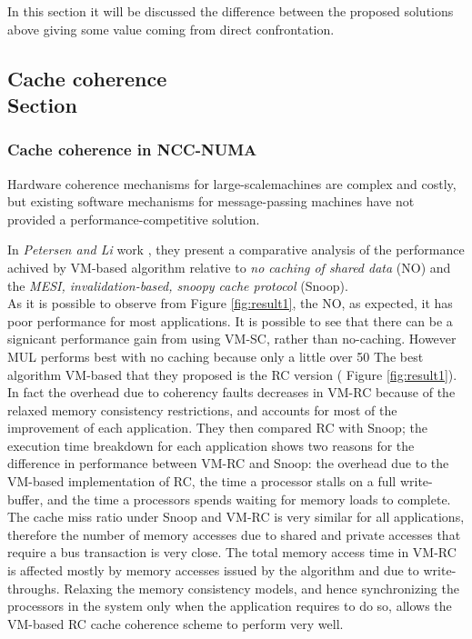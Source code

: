 \documentclass[a4paper,10pt]{article}
\begin{document}
\begin{multicols}{2}
In this section it will be discussed the difference between the proposed solutions above giving some value coming from direct confrontation.

\subsection{Cache coherence \\ Section}

\subsubsection{Cache coherence in NCC-NUMA}
Hardware coherence mechanisms for large-scalemachines are complex and costly, but existing software mechanisms for message-passing machines have not provided a performance-competitive solution. \par 
\parindent 10mm In  \emph{Petersen and Li} work \cite{Li95multiprocessorcache},  they present a comparative analysis of the performance achived by VM-based algorithm relative to \emph{no caching of shared data} (NO) and the \emph{MESI, invalidation-based, snoopy cache protocol} (Snoop). \\
As it is possible to observe from Figure \ref{fig:result1}, the NO, as expected, it has poor performance for most applications. It is possible to see that there can be a signicant performance gain from using VM-SC, rather than no-caching. However MUL performs best with no caching because only a little over 50%
\parindent 10mm The best algorithm VM-based that they proposed is the RC version ( Figure \ref{fig:result1}). In fact the overhead due to coherency faults decreases in VM-RC because of the relaxed memory consistency restrictions, and accounts for most of the improvement of each application. They then compared RC with Snoop; the execution time breakdown for each application shows two reasons for the difference in performance between VM-RC and Snoop: the overhead due to the VM-based implementation of RC, the time a processor stalls on a full write-buffer, and the time a processors spends waiting for memory loads to complete. The cache miss ratio under Snoop and VM-RC is very similar for all applications, therefore the number of memory accesses due to shared and private accesses that require a bus transaction is very close. The total memory access time in VM-RC is affected mostly by memory  accesses issued by the algorithm and due to write-throughs. Relaxing the memory consistency models, and hence synchronizing the processors in the system only  when the application requires to do so, allows the VM-based RC cache coherence scheme to perform very well. 



\end{multicols}
\end{document}
